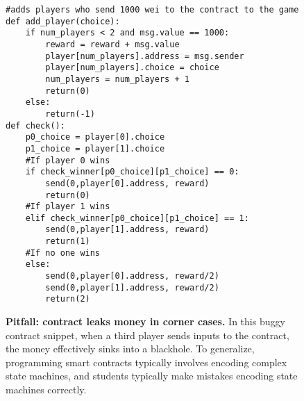 \documentclass[10pt,twocolumn,letterpaper]{article}
\newcommand{\ignore}[1]{}
\begin{document}
\begin{figure}
\begin{mdframed}
\begin{verbatim}
#adds players who send 1000 wei to the contract to the game
def add_player(choice):
	if num_players < 2 and msg.value == 1000:
		reward = reward + msg.value
		player[num_players].address = msg.sender
		player[num_players].choice = choice
		num_players = num_players + 1
		return(0)
	else:
		return(-1)
def check():
	p0_choice = player[0].choice
	p1_choice = player[1].choice
	#If player 0 wins
	if check_winner[p0_choice][p1_choice] == 0:
		send(0,player[0].address, reward)
		return(0)
	#If player 1 wins
	elif check_winner[p0_choice][p1_choice] == 1:
		send(0,player[1].address, reward)
		return(1)
	#If no one wins
	else:
		send(0,player[0].address, reward/2)
		send(0,player[1].address, reward/2)
		return(2)
\end{verbatim}
\end{mdframed}
\caption{
\label{fig:moneyleaks}
{\bf Pitfall: contract leaks money in corner cases.}
In this buggy contract snippet, when a third player 
sends inputs to the contract, the
money effectively sinks into a blackhole.
To generalize, programming smart contracts 
typically involves encoding complex state machines, and
students typically make mistakes encoding 
state machines correctly. 
}
\end{figure}

\ignore{
In this section, a user adds themselves to the game by sending a small amount of ether with their transaction. The contract takes this ether, stored in $msg.value$, and adds it to the winnings pool, the prize that the winner of each round will receive. Let's consider two scenarios our contract currently allows 1) a potential entrant sends too much or too little ether, 2) there are already two participants, so additional players send transactions to join, but are not allowed. In both of the following scenarios the contract will keep their money. If someone sent too much or too little to enter they will not be added as a player, but their funds will be kept. Even worse, if the match is full any person who tries to join (they have no way of knowing it is full) will pay to play but never be added to a game! Both of these errors will cause distrust in our contract, eventually resulting in the community not trusting this particular contract and, more importantly, this contract's author - you.
}
\end{document}

